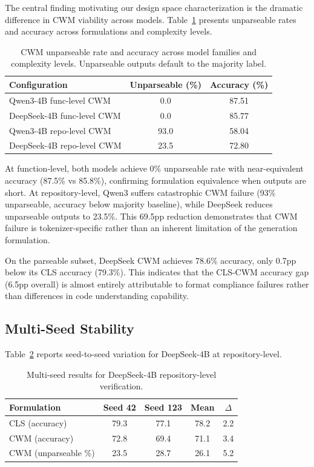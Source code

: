 \documentclass[11pt]{article}
\begin{document}
The central finding motivating our design space characterization is the dramatic difference in CWM viability across models. Table~\ref{tab:cwm-unparseable} presents unparseable rates and accuracy across formulations and complexity levels.

\begin{table}[t]
\centering
\caption{CWM unparseable rate and accuracy across model families and complexity levels. Unparseable outputs default to the majority label.}
\label{tab:cwm-unparseable}
\begin{tabular}{lcc}
\toprule
Configuration & Unparseable (\%) & Accuracy (\%) \\
\midrule
Qwen3-4B func-level CWM & 0.0 & 87.51 \\
DeepSeek-4B func-level CWM & 0.0 & 85.77 \\
\midrule
Qwen3-4B repo-level CWM & 93.0 & 58.04 \\
DeepSeek-4B repo-level CWM & 23.5 & 72.80 \\
\bottomrule
\end{tabular}
\end{table}

At function-level, both models achieve 0\% unparseable rate with near-equivalent accuracy (87.5\% vs 85.8\%), confirming formulation equivalence when outputs are short. At repository-level, Qwen3 suffers catastrophic CWM failure (93\% unparseable, accuracy below majority baseline), while DeepSeek reduces unparseable outputs to 23.5\%. This 69.5pp reduction demonstrates that CWM failure is tokenizer-specific rather than an inherent limitation of the generation formulation.

On the parseable subset, DeepSeek CWM achieves 78.6\% accuracy, only 0.7pp below its CLS accuracy (79.3\%). This indicates that the CLS-CWM accuracy gap (6.5pp overall) is almost entirely attributable to format compliance failures rather than differences in code understanding capability.

\subsection{Multi-Seed Stability}
\label{sec:multiseed}

Table~\ref{tab:multiseed} reports seed-to-seed variation for DeepSeek-4B at repository-level.

\begin{table}[t]
\centering
\caption{Multi-seed results for DeepSeek-4B repository-level verification.}
\label{tab:multiseed}
\begin{tabular}{lcccc}
\toprule
Formulation & Seed 42 & Seed 123 & Mean & $\Delta$ \\
\midrule
CLS (accuracy) & 79.3 & 77.1 & 78.2 & 2.2 \\
CWM (accuracy) & 72.8 & 69.4 & 71.1 & 3.4 \\
CWM (unparseable \%) & 23.5 & 28.7 & 26.1 & 5.2 \\
\bottomrule
\end{tabular}
\end{table}
\end{document}
